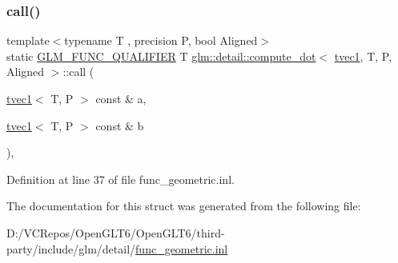 \subsubsection{\texorpdfstring{call()}{call()}}
{\footnotesize\ttfamily template$<$typename T , precision P, bool Aligned$>$ \\
static \mbox{\hyperlink{setup_8hpp_a33fdea6f91c5f834105f7415e2a64407}{G\+L\+M\+\_\+\+F\+U\+N\+C\+\_\+\+Q\+U\+A\+L\+I\+F\+I\+ER}} T \mbox{\hyperlink{structglm_1_1detail_1_1compute__dot}{glm\+::detail\+::compute\+\_\+dot}}$<$ \mbox{\hyperlink{structglm_1_1tvec1}{tvec1}}, T, P, Aligned $>$\+::call (\begin{DoxyParamCaption}\item[{\mbox{\hyperlink{structglm_1_1tvec1}{tvec1}}$<$ T, P $>$ const \&}]{a,  }\item[{\mbox{\hyperlink{structglm_1_1tvec1}{tvec1}}$<$ T, P $>$ const \&}]{b }\end{DoxyParamCaption})\hspace{0.3cm}{\ttfamily [inline]}, {\ttfamily [static]}}



Definition at line 37 of file func\+\_\+geometric.\+inl.



The documentation for this struct was generated from the following file\+:\begin{DoxyCompactItemize}
\item 
D\+:/\+V\+C\+Repos/\+Open\+G\+L\+T6/\+Open\+G\+L\+T6/third-\/party/include/glm/detail/\mbox{\hyperlink{func__geometric_8inl}{func\+\_\+geometric.\+inl}}\end{DoxyCompactItemize}
